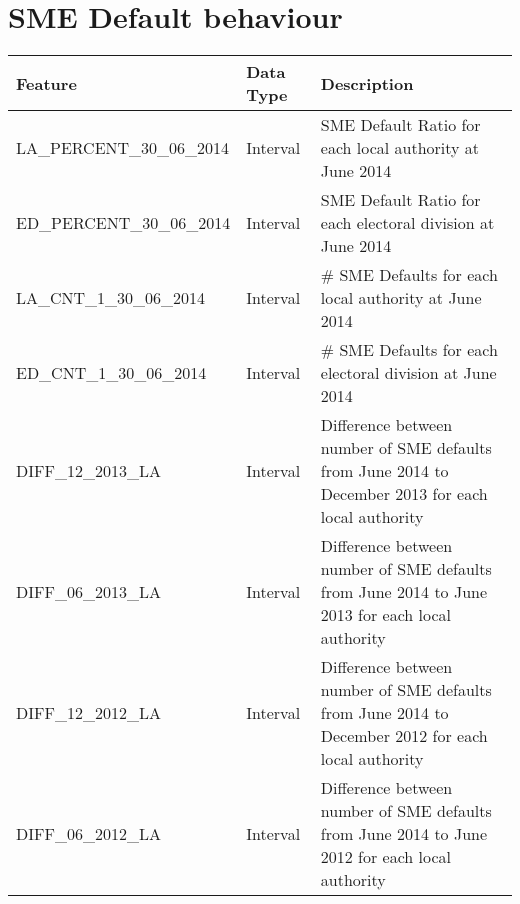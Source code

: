 
\chapter{SME Default behaviour} %

\label{AppendixF} %


\begin{table}[H]
	\centering
	\resizebox{\textwidth}{!}
	{
		\begin{tabular}{|l|l|l|}
			\hline
			\textbf{Feature} & \textbf{Data Type} & \textbf{Description}                                                                                                                                                                                                                                                                                                                                                                                                                                                                                                                              \\ \hline
			LA\_PERCENT\_30\_06\_2014 & Interval & SME Default Ratio for each local authority at June 2014 \\ \hline
			ED\_PERCENT\_30\_06\_2014 & Interval & SME Default Ratio for each electoral division at June 2014 \\ \hline
			LA\_CNT\_1\_30\_06\_2014 & Interval & \# SME Defaults for each local authority at June 2014 \\ \hline
			ED\_CNT\_1\_30\_06\_2014 & Interval & \# SME Defaults for each electoral division at June 2014\\ \hline
			DIFF\_12\_2013\_LA & Interval & Difference between number of SME defaults from June 2014 to December 2013 for each local authority \\ \hline
			DIFF\_06\_2013\_LA & Interval & Difference between number of SME defaults from June 2014 to June 2013 for each local authority \\ \hline
			DIFF\_12\_2012\_LA & Interval & Difference between number of SME defaults from June 2014 to December 2012 for each local authority \\ \hline
			DIFF\_06\_2012\_LA & Interval & Difference between number of SME defaults from June 2014 to June 2012 for each local authority \\ \hline
			

\end{tabular}}
\end{table}
